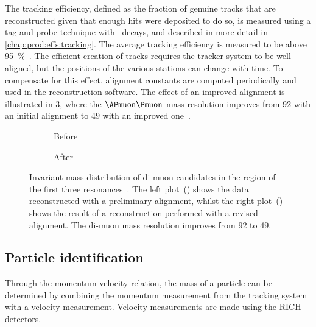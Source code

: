 The tracking efficiency, defined as the fraction of genuine tracks that are 
reconstructed given that enough hits were deposited to do so, is measured using 
a tag-and-probe technique with \JpsiTomumu\ decays, and described in more 
detail in \cref{chap:prod:effs:tracking}.
The average tracking efficiency is measured to be above 
\SI{95}{\percent}~\cite{Aaij:2014pwa}.
The efficient creation of tracks requires the tracker system to be well 
aligned, but the positions of the various stations can change with time.
To compensate for this effect, alignment constants are computed periodically 
and used in the reconstruction software.
The effect of an improved alignment is illustrated in 
\cref{fig:intro:lhcb:alignment}, where the $\APmuon\Pmuon$ mass resolution 
improves from \SI{92}{\MeVcc} with an initial alignment to \SI{49}{\MeVcc} with 
an improved one~\cite{Dujany:082010}.

\begin{figure}
  \begin{subfigure}{0.5\textwidth}
    \centering
    
    \caption{Before}
    \label{fig:intro:lhcb:alignment:pre}
  \end{subfigure}
  \begin{subfigure}{0.5\textwidth}
    \centering
    
    \caption{After}
    \label{fig:intro:lhcb:alignment:post}
  \end{subfigure}
  \caption{%
    Invariant mass distribution of di-muon candidates in the region of the 
    first three \PUpsilon resonances~\cite{Dujany:082010}.
    The left plot~() shows the data 
    reconstructed with a preliminary alignment, whilst the right 
    plot~() shows the result of a 
    reconstruction performed with a revised alignment.
    The di-muon mass resolution improves from \SI{92}{\MeVcc} to 
    \SI{49}{\MeVcc}.
  }
  \label{fig:intro:lhcb:alignment}
\end{figure}

\subsection{Particle identification}
\label{chap:intro:lhcb:detector:pid}

Through the momentum-velocity relation, the mass of a particle can be 
determined by combining the momentum measurement from the tracking system with 
a velocity measurement.
Velocity measurements are made using the \ac{RICH} detectors.

